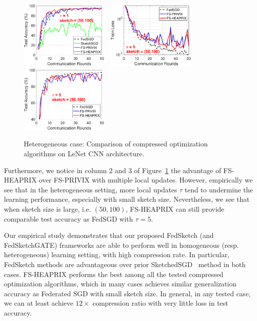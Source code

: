 \documentclass[twoside]{article}
\begin{document}
\begin{figure}[t]
\begin{center}
{		\includegraphics[width=1.7in]{MNIST_figures/local1_sketch50_iid0_test_acc.eps} \hspace{-0.2in}
		}
		\mbox{
		\includegraphics[width=1.7in]{MNIST_figures/local5_sketch50_iid0_train_loss.eps}\hspace{-0.2in}
		\includegraphics[width=1.7in]{MNIST_figures/local5_sketch50_iid0_test_acc.eps}\hspace{-0.2in}
		}
	\end{center}
	\caption{Heterogeneous case: Comparison of compressed optimization algorithms on LeNet CNN architecture.}
    \label{fig:MNIST-iid0}
\end{figure}
Furthermore, we notice in column 2 and 3 of Figure~\ref{fig:MNIST-iid0} the advantage of FS-HEAPRIX over FS-PRIVIX with multiple local updates. However, empirically we see that in the heterogeneous setting, more local updates $\tau$ tend to undermine the learning performance, especially with small sketch size.  Nevertheless, we see that when sketch size is large, i.e. $(50,100)$, FS-HEAPRIX can still provide comparable test accuracy as FedSGD with $\tau=5$.

Our empirical study demonstrates that our proposed FedSketch (and FedSketchGATE) frameworks are able to perform well in homogeneous (resp. heterogeneous) learning setting, with high compression rate. In particular, FedSketch methods are advantageous over prior SketchedSGD~\cite{ivkin2019communication} method in both cases. FS-HEAPRIX performs the best among all the tested compressed optimization algorithms, which in many cases achieves similar generalization accuracy as Federated SGD with small sketch size. In general, in any tested case, we can at least achieve $12\times$ compression ratio with very little loss in test accuracy.
\end{document}
